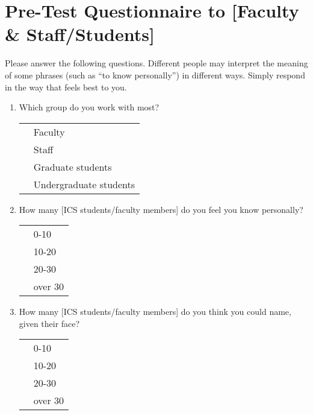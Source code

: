 \newpage
\chapter{Pre-Test Questionnaire to [Faculty \& Staff/Students]}
\label{sec:pre-test}
Please answer the following questions.  Different people may interpret the
meaning of some phrases (such as ``to know personally'') in different
ways. Simply respond in the way that feels best to you.

\begin{enumerate}

\item{Which group do you work with most?}\\
  \begin{tabular}{ll}
    \underline{  }\underline{  }\underline{  }  & Faculty \\
    \underline{  }\underline{  }\underline{  }  & Staff \\
    \underline{  }\underline{  }\underline{  }  & Graduate students \\
    \underline{  }\underline{  }\underline{  }  & Undergraduate students \\
  \end{tabular}

\item{How many [ICS students/faculty members] do you feel you know
  personally?}\\
  \begin{tabular}{ll}
    \underline{  }\underline{  }\underline{  }  & 0-10 \\
    \underline{  }\underline{  }\underline{  }  & 10-20 \\
    \underline{  }\underline{  }\underline{  }  & 20-30 \\
    \underline{  }\underline{  }\underline{  }  & over 30 \\
  \end{tabular}

\item{How many [ICS students/faculty members] do you think you could name,
  given their face?}\\
  \begin{tabular}{ll}
    \underline{  }\underline{  }\underline{  }  & 0-10 \\
    \underline{  }\underline{  }\underline{  }  & 10-20 \\
    \underline{  }\underline{  }\underline{  }  & 20-30 \\
    \underline{  }\underline{  }\underline{  }  & over 30 \\
  \end{tabular}


\end{enumerate}
